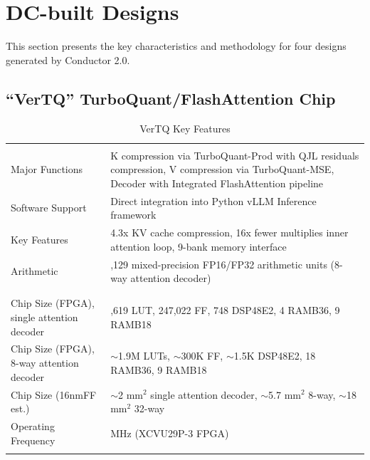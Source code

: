 \section{DC-built Designs}
\label{sec:designs}

This section presents the key characteristics and methodology for four designs generated by Conductor 2.0.

\subsection{``VerTQ'' TurboQuant/FlashAttention Chip}

\begin{table}[h]
	\centering
	\small
	\begin{tabularx}{\linewidth}{
			@{}
			>{\raggedright\arraybackslash\hsize=0.5\hsize}X
			>{\raggedright\arraybackslash\hsize=1.5\hsize}X
			@{}
		}
		\hline
		\multicolumn{2}{c}{\textbf{VerTQ Key Features}} \\
		\hline \\
		Major Functions &
		K compression via TurboQuant-Prod with QJL residuals compression, V compression via TurboQuant-MSE, Decoder with Integrated FlashAttention pipeline \\
		
		Software Support &
		Direct integration into Python vLLM Inference framework \\
		
		Key Features &
		4.3x KV cache compression, 16x fewer multiplies inner attention loop, 9-bank memory interface \\
		Arithmetic & 5,129 mixed-precision FP16/FP32 arithmetic units (8-way attention decoder) \\ \\
		\hline \\
		Chip Size (FPGA), single attention decoder &
		500,619 LUT, 247,022 FF, 748 DSP48E2, 4 RAMB36, 9 RAMB18 \\
		
		Chip Size (FPGA), 8-way attention decoder &
		$\sim$1.9M LUTs, $\sim$300K FF, $\sim$1.5K DSP48E2, 18 RAMB36, 9 RAMB18 \\
		
		Chip Size (16nmFF est.) &
		$\sim$2 mm$^2$ single attention decoder, $\sim$5.7 mm$^2$ 8-way, $\sim$18 mm$^2$ 32-way \\
		
		Operating Frequency &
		125 MHz (XCVU29P-3 FPGA)\\ \\
		\hline
	\end{tabularx}
	\caption{VerTQ Key Features}
	\label{tab:vertq_features}
\end{table}

